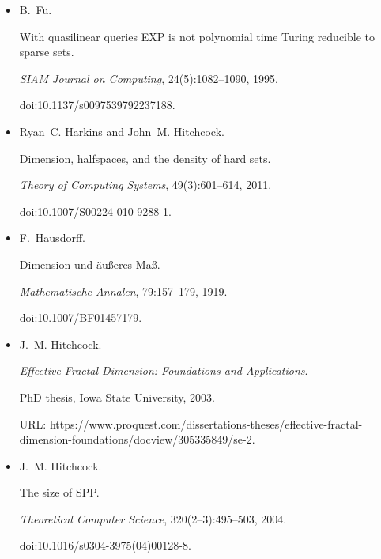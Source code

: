 \documentclass[10pt,a4paper]{article}
\begin{document}
\begin{itemize}
doi:10.1016/j.ipl.2005.03.009.





\item[] 
[25]

B. Fu.


With quasilinear queries EXP is not polynomial time Turing
reducible to sparse sets.


\emph{SIAM Journal on Computing}, 24(5):1082–1090, 1995.


doi:10.1137/s0097539792237188.





\item[] 
[26]

Ryan C. Harkins and John M. Hitchcock.


Dimension, halfspaces, and the density of hard sets.


\emph{Theory of Computing Systems}, 49(3):601–614, 2011.


doi:10.1007/S00224-010-9288-1.





\item[] 
[27]

F. Hausdorff.


Dimension und äußeres Maß.


\emph{Mathematische Annalen}, 79:157–179, 1919.


doi:10.1007/BF01457179.





\item[] 
[28]

J. M. Hitchcock.


\emph{Effective Fractal Dimension: Foundations and Applications}.


PhD thesis, Iowa State University, 2003.


URL:
https://www.proquest.com/dissertations-theses/effective-fractal-dimension-foundations/docview/305335849/se-2.





\item[] 
[29]

J. M. Hitchcock.


The size of SPP.


\emph{Theoretical Computer Science}, 320(2–3):495–503, 2004.


doi:10.1016/s0304-3975(04)00128-8.






\end{itemize}
\end{document}
